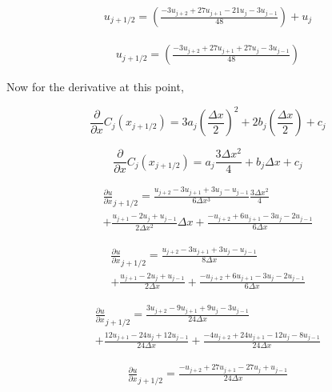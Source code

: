 \documentclass[12pt]{article}
\begin{document}
\begin{equation}
\begin{split}
u_{j + 1/2} = \left(\frac{-3u_{j+2} + 27u_{j+1} - 21u_j - 3u_{j-1}}{48}\right) + u_j
\end{split}
\end{equation}

\begin{equation}
\begin{split}
u_{j + 1/2} = \left(\frac{-3u_{j+2} + 27u_{j+1} + 27u_j - 3u_{j-1}}{48}\right)
\end{split}
\end{equation}

Now for the derivative at this point,

\[\frac{\partial }{\partial x}C_j (x_{j + 1/2}) = 3a_j (\frac{\Delta x}{2})^2 + 2b_j(\frac{\Delta x}{2}) + c_j \]

\[\frac{\partial }{\partial x}C_j (x_{j + 1/2}) = a_j\frac{3\Delta x^2}{4} + b_j\Delta x + c_j \]

\begin{equation}
\begin{split}
\frac{\partial u}{\partial x}_{j + 1/2} = \frac{u_{j+2} - 3u_{j+1} + 3u_j - u_{j-1}}{6 \Delta x^3}\frac{3\Delta x^2}{4}  \\+ \frac{u_{j+1} - 2u_j + u_{j-1}}{2 \Delta x^2 }\Delta x + \frac{ -u_{j+2} + 6u_{j+1} - 3u_j - 2u_{j-1}}{6 \Delta x} 
\end{split}
\end{equation}

\begin{equation}
\begin{split}
\frac{\partial u}{\partial x}_{j + 1/2} = \frac{u_{j+2} - 3u_{j+1} + 3u_j - u_{j-1}}{8 \Delta x} \\+ \frac{u_{j+1} - 2u_j + u_{j-1}}{2 \Delta x } + \frac{ -u_{j+2} + 6u_{j+1} - 3u_j - 2u_{j-1}}{6 \Delta x} 
\end{split}
\end{equation}

\begin{equation}
\begin{split}
\frac{\partial u}{\partial x}_{j + 1/2} = \frac{3u_{j+2} - 9u_{j+1} + 9u_j - 3u_{j-1}}{24 \Delta x} \\+ \frac{12u_{j+1} - 24u_j + 12u_{j-1}}{24 \Delta x } + \frac{ -4u_{j+2} + 24u_{j+1} - 12u_j - 8u_{j-1}}{24 \Delta x} 
\end{split}
\end{equation}

\begin{equation}
\begin{split}
\frac{\partial u}{\partial x}_{j + 1/2} = \frac{-u_{j+2} + 27u_{j+1} - 27u_j + u_{j-1}}{24 \Delta x}
\end{split}
\end{equation}
\end{document}
